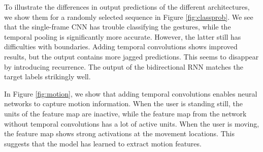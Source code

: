 \documentclass[11pt,a4paper]{article} \usepackage{a4wide}
\begin{document}
To illustrate the differences in output predictions of the different architectures, we show them for a randomly selected sequence in Figure \ref{fig:classprob}. We see that the single-frame CNN has trouble classifying the gestures, while the temporal pooling is significantly more accurate. However, the latter still has difficulties with boundaries. Adding temporal convolutions shows improved results, but the output contains more jagged predictions. This seems to disappear by introducing recurrence. The output of the bidirectional RNN matches the target labels strikingly well. 


In Figure \ref{fig:motion}, we show that adding temporal convolutions enables neural networks to capture motion information. When the user is standing still, the units of the feature map are inactive, while the feature map from the network without temporal convolutions has a lot of active units. When the user is moving, the feature map shows strong activations at the movement locations. This suggests that the model has learned to extract motion features.
\end{document}
